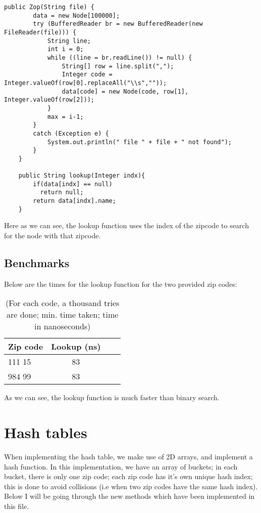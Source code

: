 \documentclass[a4paper,11pt]{article}
\begin{document}
\begin{verbatim}
public Zop(String file) {
        data = new Node[100000];
        try (BufferedReader br = new BufferedReader(new FileReader(file))) {
            String line;
            int i = 0;
            while ((line = br.readLine()) != null) {
                String[] row = line.split(",");
                Integer code = Integer.valueOf(row[0].replaceAll("\\s",""));
                data[code] = new Node(code, row[1], Integer.valueOf(row[2]));
            }
            max = i-1;
        }
        catch (Exception e) {
            System.out.println(" file " + file + " not found");
        }
    }

    public String lookup(Integer indx){
        if(data[indx] == null)
          return null;
        return data[indx].name;
    }
\end{verbatim}

Here as we can see, the lookup function uses the index of the zipcode to search for the node with that zipcode.


\subsection*{Benchmarks}
Below are the times for the lookup function for the two provided zip codes:

\begin{table}[h]
\begin{center}
\begin{tabular}{l|c|c|c}
\textbf{Zip code} & \textbf{Lookup (ns)}\\
\hline
  111 15      &  83\\
  984 99      &  83\\
\end{tabular}
\caption{(For each code, a thousand tries are done; min. time taken; time in nanoseconds)}
\label{tab:table1}
\end{center}
\end{table}

As we can see, the lookup function is much faster than binary search.

\section*{Hash tables}
When implementing the hash table, we make use of 2D arrays, and implement a hash function. In this implementation, we have an array of buckets; in each bucket, there is only one zip code; each zip code has it's own unique hash index;  this is done to avoid collisions (i.e when two zip codes have the same hash index). Below I will be going through the new methods which have been implemented in this file.
\end{document}
